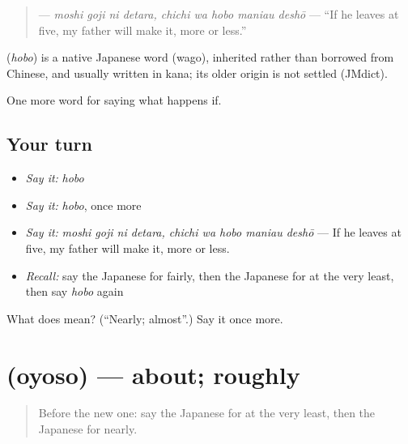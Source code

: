 \begin{quote}
\textbf{    } — \emph{moshi goji ni detara, chichi wa hobo maniau deshō} — \textquotedblleft{}If he leaves at five, my father will make it, more or less.\textquotedblright{}
\end{quote}

\begin{cousinweb}
\textbf{} (\emph{hobo}) is a native Japanese word (wago), inherited rather than borrowed from Chinese, and usually written in kana; its older origin is not settled (JMdict).
\end{cousinweb}

\begin{grammarlens}[title={What you've built}]
One more word for saying what happens if.
\end{grammarlens}

\subsection*{Your turn}
\begin{itemize}
\raggedright
  \item \emph{Say it:} \emph{hobo}
  \item \emph{Say it:} \emph{hobo}, once more
  \item \emph{Say it:} \emph{moshi goji ni detara, chichi wa hobo maniau deshō} — If he leaves at five, my father will make it, more or less.
  \item \emph{Recall:} say the Japanese for fairly, then the Japanese for at the very least, then say \emph{hobo} again
\end{itemize}

\begin{tcolorbox}[breakable,colback=teal!4,colframe=teal!35!black,title={Before you move on}]
What does  mean? (\textquotedblleft{}Nearly; almost\textquotedblright{}.) Say it once more.
\end{tcolorbox}
\section[\texorpdfstring{\ja{およそ} (oyoso)}{およそ (oyoso)}]{ (oyoso) — about; roughly}

\label{lesson:JA-C530-oyoso}



\begin{quote}
Before the new one: say the Japanese for at the very least, then the Japanese for nearly.
\end{quote}

